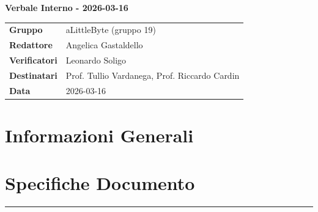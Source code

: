 \documentclass[a4paper,12pt]{article}
\begin{document}
\thispagestyle{firstpage}

\vspace*{0.5cm}

\begin{center}
    {\LARGE \textbf{Verbale Interno - 2026-03-16}}
\end{center}

\vspace{1.5cm}

\begin{center}
    \renewcommand{\arraystretch}{1.3}
    \begin{tcolorbox}[
        width=0.92\textwidth,
        colback=gray!6,
        colframe=gray!45,
        boxrule=0.5pt,
        arc=2mm,
        boxsep=0pt,
        left=8pt, right=8pt, top=8pt, bottom=8pt
    ]
        \begin{tabularx}{\linewidth}{>{\bfseries}p{3.5cm} X}
            Gruppo      & aLittleByte (gruppo 19) \\
            Redattore   & Angelica Gastaldello \\
            Verificatori& Leonardo Soligo\\
            Destinatari & Prof. Tullio Vardanega, Prof. Riccardo Cardin \\
            Data        &  2026-03-16\\
        \end{tabularx}
    \end{tcolorbox}
\end{center}

\newpage

\tableofcontents
\newpage

\section{Informazioni Generali}
\section*{Specifiche Documento}
\hrule
\vspace{1cm}
\end{document}
